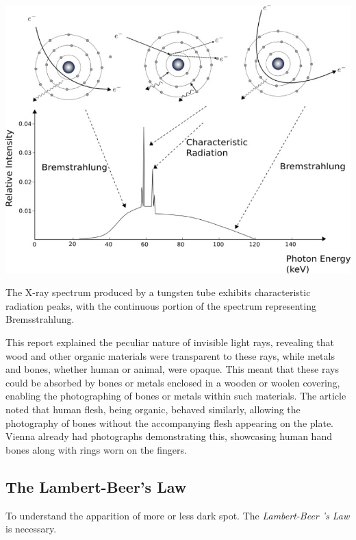 \documentclass[a4paper,12pt]{report}
\begin{document}
\begin{center}
  \includegraphics[scale = 0.5]{xraytungsten.jpg}
  \label{xraytungsten}
\end{center}

The X-ray spectrum produced by a tungsten tube exhibits characteristic radiation peaks, with the
continuous portion of the spectrum representing Bremsstrahlung.

This report  explained the peculiar nature of invisible light rays, revealing that wood and other
organic materials were transparent to these rays, while metals and bones, whether human or
animal, were opaque. This meant that these rays could be absorbed by bones or metals enclosed
in a wooden or woolen covering, enabling the photographing of bones or metals within such
materials. The article noted that human flesh, being organic, behaved similarly, allowing the
photography of bones without the accompanying flesh appearing on the plate. Vienna already had
photographs demonstrating this, showcasing human hand bones along with rings worn on the
fingers.



\subsection{The Lambert-Beer's Law}

To understand the apparition of more or less dark spot. The \textit{Lambert-Beer 's Law} is necessary.
\end{document}
